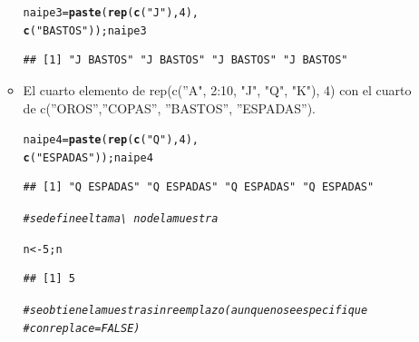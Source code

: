 \documentclass[12pt,letterpaper]{article}\usepackage[]{graphicx}\usepackage[]{color}
\makeatletter
\newcommand{\hlnum}[1]{\textcolor[rgb]{0.686,0.059,0.569}{#1}}%
\newcommand{\hlstr}[1]{\textcolor[rgb]{0.192,0.494,0.8}{#1}}%
\newcommand{\hlcom}[1]{\textcolor[rgb]{0.678,0.584,0.686}{\textit{#1}}}%
\newcommand{\hlstd}[1]{\textcolor[rgb]{0.345,0.345,0.345}{#1}}%
\newcommand{\hlkwb}[1]{\textcolor[rgb]{0.69,0.353,0.396}{#1}}%
\newcommand{\hlkwd}[1]{\textcolor[rgb]{0.737,0.353,0.396}{\textbf{#1}}}%
\newenvironment{kframe}{%
 \def\at@end@of@kframe{}%
 \ifinner\ifhmode%
  \def\at@end@of@kframe{\end{minipage}}%
  \begin{minipage}{\columnwidth}%
 \fi\fi%
 \def\FrameCommand##1{\hskip\@totalleftmargin \hskip-\fboxsep
 \colorbox{shadecolor}{##1}\hskip-\fboxsep
     \hskip-\linewidth \hskip-\@totalleftmargin \hskip\columnwidth}%
 \MakeFramed {\advance\hsize-\width
   \@totalleftmargin\z@ \linewidth\hsize
   \@setminipage}}%
 {\par\unskip\endMakeFramed%
 \at@end@of@kframe}
\newenvironment{knitrout}{}{} %
\makeatother
\begin{document}
\begin{enumerate}
\begin{itemize}
\begin{knitrout}
\color{fgcolor}\begin{kframe}
\begin{alltt}
\hlstd{naipe3} \hlkwb{=} \hlkwd{paste}\hlstd{(}\hlkwd{rep}\hlstd{(}\hlkwd{c}\hlstd{(}\hlstr{"J"}\hlstd{),}\hlnum{4}\hlstd{),}
              \hlkwd{c}\hlstd{(}\hlstr{"BASTOS"}\hlstd{));naipe3}
\end{alltt}
\begin{verbatim}
## [1] "J BASTOS" "J BASTOS" "J BASTOS" "J BASTOS"
\end{verbatim}
\end{kframe}
\end{knitrout}

\item El cuarto elemento de rep(c(''A", 2:10, "J", "Q", "K"), 4) con el cuarto\\ 
de c(''OROS'',''COPAS'', ''BASTOS'', ''ESPADAS'').

\begin{knitrout}
\color{fgcolor}\begin{kframe}
\begin{alltt}
\hlstd{naipe4} \hlkwb{=} \hlkwd{paste}\hlstd{(}\hlkwd{rep}\hlstd{(}\hlkwd{c}\hlstd{(}\hlstr{"Q"}\hlstd{),} \hlnum{4}\hlstd{),}
              \hlkwd{c}\hlstd{(}\hlstr{"ESPADAS"}\hlstd{));naipe4}
\end{alltt}
\begin{verbatim}
## [1] "Q ESPADAS" "Q ESPADAS" "Q ESPADAS" "Q ESPADAS"
\end{verbatim}
\end{kframe}
\end{knitrout}

\begin{knitrout}
\color{fgcolor}\begin{kframe}
\begin{alltt}
\hlcom{# se define el tama\textbackslash{}~no de la muestra }

\hlstd{n} \hlkwb{<-} \hlnum{5}\hlstd{; n}
\end{alltt}
\begin{verbatim}
## [1] 5
\end{verbatim}
\end{kframe}
\end{knitrout}

\begin{knitrout}
\color{fgcolor}\begin{kframe}
\begin{alltt}
\hlcom{# se obtiene la muestra sin reemplazo (aunque no se especifique }
\hlcom{# con replace=FALSE) }


\end{alltt}
\end{kframe}
\end{knitrout}
\end{itemize}
\end{enumerate}
\end{document}
